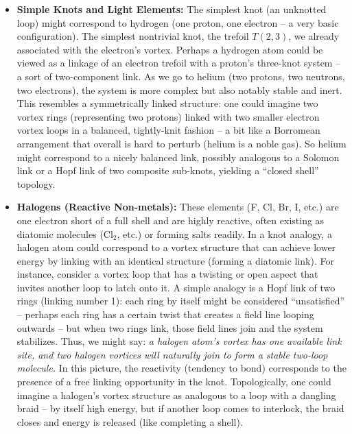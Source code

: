 \begin{itemize}
    \item \textbf{Simple Knots and Light Elements:} The simplest knot (an unknotted loop) might correspond to hydrogen (one proton, one electron -- a very basic configuration). The simplest nontrivial knot, the trefoil $T(2,3)$, we already associated with the electron's vortex. Perhaps a hydrogen atom could be viewed as a linkage of an electron trefoil with a proton's three-knot system -- a sort of two-component link. As we go to helium (two protons, two neutrons, two electrons), the system is more complex but also notably stable and inert. This resembles a symmetrically linked structure: one could imagine two vortex rings (representing two protons) linked with two smaller electron vortex loops in a balanced, tightly-knit fashion -- a bit like a Borromean arrangement that overall is hard to perturb (helium is a noble gas). So helium might correspond to a nicely balanced link, possibly analogous to a Solomon link or a Hopf link of two composite sub-knots, yielding a ``closed shell'' topology.

    \item \textbf{Halogens (Reactive Non-metals):} These elements (F, Cl, Br, I, etc.) are one electron short of a full shell and are highly reactive, often existing as diatomic molecules (Cl$_2$, etc.) or forming salts readily. In a knot analogy, a halogen atom could correspond to a vortex structure that can achieve lower energy by linking with an identical structure (forming a diatomic link). For instance, consider a vortex loop that has a twisting or open aspect that invites another loop to latch onto it. A simple analogy is a Hopf link of two rings (linking number 1): each ring by itself might be considered ``unsatisfied'' -- perhaps each ring has a certain twist that creates a field line looping outwards -- but when two rings link, those field lines join and the system stabilizes. Thus, we might say: \textit{a halogen atom's vortex has one available link site, and two halogen vortices will naturally join to form a stable two-loop molecule.} In this picture, the reactivity (tendency to bond) corresponds to the presence of a free linking opportunity in the knot. Topologically, one could imagine a halogen's vortex structure as analogous to a loop with a dangling braid -- by itself high energy, but if another loop comes to interlock, the braid closes and energy is released (like completing a shell).


\end{itemize}
